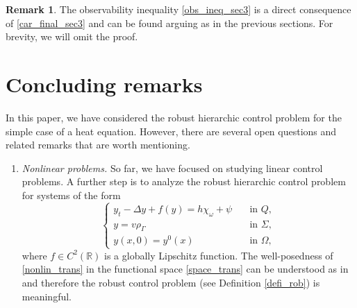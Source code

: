 \documentclass{dcds-bOF}
\theoremstyle{definition}
\newtheorem{remark}{Remark}
\def\csbd{\rho_{\Gamma}}
\begin{document}
\begin{remark} The observability inequality \eqref{obs_ineq_sec3} is a direct consequence of \eqref{car_final_sec3} and can be found arguing as in the previous sections. For brevity, we will omit the proof.
\end{remark}

\section{Concluding remarks}\label{sec_conclusion}

In this paper, we have considered the robust hierarchic control problem for the simple case of a heat equation. However, there are several open questions and related remarks that are worth mentioning.

\begin{enumerate}
\item \textit{Nonlinear problems.} So far, we have focused on studying linear control problems. A further step is to analyze the robust hierarchic control problem for systems of the form
%
\begin{equation}\label{nonlin_trans}
\begin{cases}
y_t-\Delta y+f(y)=h\chi_{\omega}+\psi &\quad \text{in } Q,\\
y=v\csbd &\quad\text{in }\Sigma, \\
y(x,0)=y^0(x) &\quad\text{in } \Omega,
\end{cases}
\end{equation}
%
where $f\in C^2(\mathbb{R})$ is a globally Lipschitz function. The well-posedness of \eqref{nonlin_trans} in the  functional space \eqref{space_trans} can be understood as in \cite[Section 8.2]{pighin} and therefore the robust control problem (see Definition \ref{defi_rob}) is meaningful.


\end{enumerate}
\end{document}
